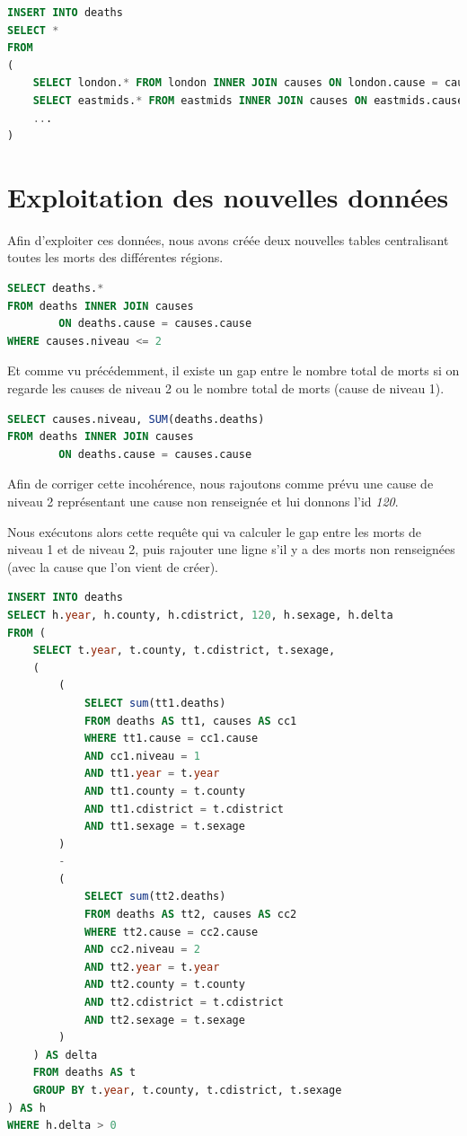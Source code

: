     \begin{lstlisting}[frame=single, language=SQL]
INSERT INTO deaths
SELECT *
FROM
(
    SELECT london.* FROM london INNER JOIN causes ON london.cause = causes.cause WHERE causes.niveau <= 2 UNION
    SELECT eastmids.* FROM eastmids INNER JOIN causes ON eastmids.cause = causes.cause WHERE causes.niveau <= 2 UNION
    ...
)
    \end{lstlisting}


\section{Exploitation des nouvelles données}

    Afin d'exploiter ces données, nous avons créée deux nouvelles tables centralisant toutes les morts des différentes régions.

    \begin{lstlisting}[frame=single, language=SQL]
SELECT deaths.*
FROM deaths INNER JOIN causes
        ON deaths.cause = causes.cause
WHERE causes.niveau <= 2
    \end{lstlisting}

    Et comme vu précédemment, il existe un gap entre le nombre total de morts si on regarde les causes de niveau 2 ou le nombre
    total de morts (cause de niveau 1).

    \begin{lstlisting}[frame=single, language=SQL]
SELECT causes.niveau, SUM(deaths.deaths)
FROM deaths INNER JOIN causes
        ON deaths.cause = causes.cause
    \end{lstlisting}

    Afin de corriger cette incohérence, nous rajoutons comme prévu une cause de niveau 2 représentant une cause non renseignée
    et lui donnons l'id \textit{120}.

    Nous exécutons alors cette requête qui va calculer le gap entre les morts de niveau 1 et de niveau 2, puis rajouter une ligne
    s'il y a des morts non renseignées (avec la cause que l'on vient de créer).

    \begin{lstlisting}[frame=single, language=SQL]
INSERT INTO deaths
SELECT h.year, h.county, h.cdistrict, 120, h.sexage, h.delta
FROM (
    SELECT t.year, t.county, t.cdistrict, t.sexage,
    (
        (
            SELECT sum(tt1.deaths)
            FROM deaths AS tt1, causes AS cc1
            WHERE tt1.cause = cc1.cause
            AND cc1.niveau = 1
            AND tt1.year = t.year
            AND tt1.county = t.county
            AND tt1.cdistrict = t.cdistrict
            AND tt1.sexage = t.sexage
        )
        -
        (
            SELECT sum(tt2.deaths)
            FROM deaths AS tt2, causes AS cc2
            WHERE tt2.cause = cc2.cause
            AND cc2.niveau = 2
            AND tt2.year = t.year
            AND tt2.county = t.county
            AND tt2.cdistrict = t.cdistrict
            AND tt2.sexage = t.sexage
        )
    ) AS delta
    FROM deaths AS t
    GROUP BY t.year, t.county, t.cdistrict, t.sexage
) AS h
WHERE h.delta > 0
    \end{lstlisting}

